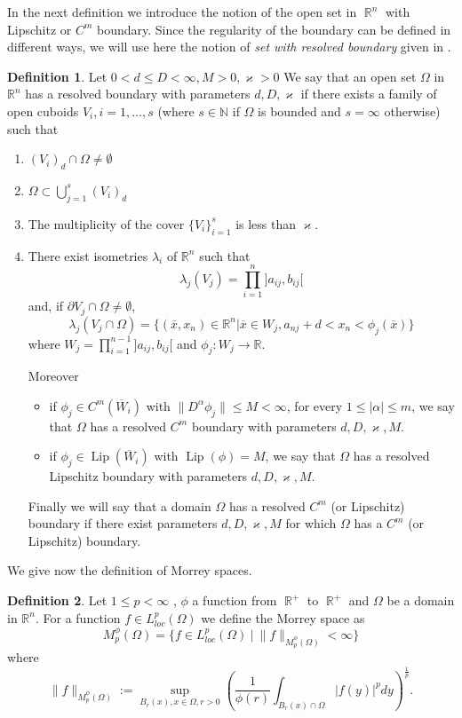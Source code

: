 \documentclass[12pt]{article}
\theoremstyle{definition}
\newtheorem{definition}{Definition}
\DeclareMathOperator\Lip{Lip}
\DeclareMathOperator\rr{\mathbb{R}}
\begin{document}
In the next definition we introduce the notion of the open set in $\rr^n$ with Lipschitz or $C^m$ boundary. Since the regularity of the boundary can be defined in different ways, we will use here the notion of \textit{set with resolved boundary} given in \cite[Section 4.3]{burenkov}.
\begin{definition}\label{resolved boundary}
Let $0<d\le D <\infty, M>0, \varkappa>0$ We say that an open set $\Omega$ in $\mathbb{R}^n$ has a resolved boundary with parameters $d,D, \varkappa$ if there exists a family of open cuboids $V_i , i=1,...,s$ (where $s \in \mathbb{N}$ if $\Omega$ is bounded and $s=\infty$ otherwise) such that
\begin{enumerate}
\item $(V_i)_d \cap \Omega \neq \emptyset$
\item $\Omega \subset \bigcup\limits_{j=1}^s (V_i)_d$
\item The multiplicity of the cover $\{ V_i\}_{i=1}^s$ is less than $ \varkappa$.
\item There exist isometries $\lambda_i$ of $\mathbb{R}^n$ such that
\[   \lambda_j(V_j)= \prod_{i=1}^n ]a_{ij},b_{ij}[\]
and, if $\partial V_j \cap \Omega \neq \emptyset$,
\[ \lambda_j(V_j\cap \Omega)= \{ (\overline x, x_n) \in \mathbb{R}^n  |  \overline x \in W_j , a_{nj}+d<x_n<\phi_j(\overline x)\} \]
where $W_j=\prod\limits_{i=1}^{n-1} ]a_{ij},b_{ij}[$ and $\phi_j : W_j \rightarrow \mathbb{R}$.

Moreover
\begin{itemize}
\item if $\phi_j \in C^m(\overline W_i)$ with  $\| D^{\alpha}\phi_j \|\le M <\infty $, for every $1\le|\alpha|\le m$, we say that $\Omega$  has a resolved $C^m$ boundary with parameters $d,D, \varkappa,M$.
\item if $\phi_j \in \Lip(\overline W_i)$ with  $\Lip(\phi)= M$,  we say that $\Omega$  has a resolved Lipschitz boundary with parameters $d,D, \varkappa,M$.
\end{itemize}
Finally we will say that a domain $\Omega$ has a resolved $C^m$ (or Lipschitz) boundary if there exist parameters $d,D,\varkappa,M$ for which $\Omega$ has a $C^m$ (or Lipschitz) boundary.
\end{enumerate}

\end{definition}
We give now the definition of Morrey spaces.
\begin{definition}
Let $1\le p< \infty$ , $\phi$ a function from $\rr^+$ to $\rr^+$ and $\Omega$ be a domain in $\mathbb{R}^n$. For a function $f \in L^p_{loc}(\Omega)$ we define the Morrey space as
\[ M_p^\phi(\Omega)=\{f \in  L^p_{loc}(\Omega) \ |\  \|f\|_{M_p^\phi(\Omega)}<\infty\}\]
where
\[ \|f\|_{M_p^\phi(\Omega)}:=\sup_{B_r(x), x \in \Omega,r>0} \left(  \frac{1}{\phi(r)}\int_{B_r(x)\cap \Omega} |f(y)|^p dy \right )^{\frac{1}{p}}.\]
\end{definition}
\end{document}
